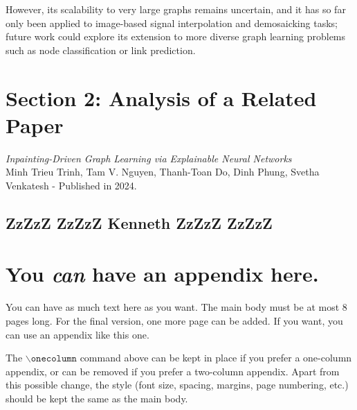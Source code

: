 \documentclass{article}
\theoremstyle{plain}
\theoremstyle{definition}
\theoremstyle{remark}
\begin{document}
However, its scalability to very large graphs remains uncertain, and it has so far only been applied to image-based signal interpolation and demosaicking tasks; future work could explore its extension to more diverse graph learning problems such as node classification or link prediction.


\setcounter{section}{2}
\setcounter{subsection}{0}
\section*{Section 2: Analysis of a Related Paper}

\textit{Inpainting-Driven Graph Learning via Explainable Neural Networks}
\\Minh Trieu Trinh, Tam V. Nguyen, Thanh-Toan Do, Dinh Phung, Svetha Venkatesh - Published in 2024.


\subsection{ZzZzZ ZzZzZ Kenneth ZzZzZ ZzZzZ}






\newpage




\newpage
\appendix
\onecolumn
\section{You \emph{can} have an appendix here.}

You can have as much text here as you want. The main body must be at most $8$ pages long.
For the final version, one more page can be added.
If you want, you can use an appendix like this one.  

The $\mathtt{\backslash onecolumn}$ command above can be kept in place if you prefer a one-column appendix, or can be removed if you prefer a two-column appendix.  Apart from this possible change, the style (font size, spacing, margins, page numbering, etc.) should be kept the same as the main body.
\end{document}
